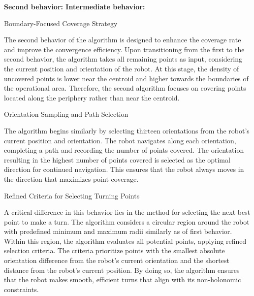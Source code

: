 \vspace*{6mm}  



\textbf{Second behavior: Intermediate behavior:} 

\vspace*{6mm}   

Boundary-Focused Coverage Strategy

The second behavior of the algorithm is designed to enhance the coverage rate and improve the convergence efficiency. Upon transitioning from the first to the second behavior, the algorithm takes all remaining points as input, considering the current position and orientation of the robot. At this stage, the density of uncovered points is lower near the centroid and higher towards the boundaries of the operational area. Therefore, the second algorithm focuses on covering points located along the periphery rather than near the centroid.

\vspace*{6mm}   

Orientation Sampling and Path Selection

The algorithm begins similarly by selecting thirteen orientations from the robot's current position and orientation. The robot navigates along each orientation, completing a path and recording the number of points covered. The orientation resulting in the highest number of points covered is selected as the optimal direction for continued navigation. This ensures that the robot always moves in the direction that maximizes point coverage.

\vspace*{6mm}   

Refined Criteria for Selecting Turning Points

A critical difference in this behavior lies in the method for selecting the next best point to make a turn. The algorithm considers a circular region around the robot with predefined minimum and maximum radii similarly as of first behavior. Within this region, the algorithm evaluates all potential points, applying refined selection criteria. The criteria prioritize points with the smallest absolute orientation difference from the robot's current orientation and the shortest distance from the robot's current position. By doing so, the algorithm ensures that the robot makes smooth, efficient turns that align with its non-holonomic constraints.

\vspace*{6mm}   

